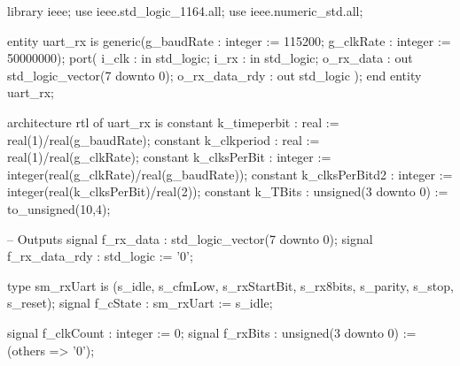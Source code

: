 \begin{VHDLlisting}[tabsize=8]
library ieee;
use ieee.std_logic_1164.all;
use ieee.numeric_std.all;

entity uart_rx is
  generic(g_baudRate : integer := 115200;
          g_clkRate  : integer := 50000000);
  port(
      i_clk           : in    std_logic;
      i_rx            : in    std_logic;
      o_rx_data       : out   std_logic_vector(7 downto 0);
      o_rx_data_rdy   : out   std_logic
  );
end entity uart_rx;

architecture rtl of uart_rx is
  constant k_timeperbit   : real := real(1)/real(g_baudRate);
  constant k_clkperiod    : real := real(1)/real(g_clkRate);
  constant k_clksPerBit   : integer := 
                            integer(real(g_clkRate)/real(g_baudRate));
  constant k_clksPerBitd2 : integer := 
                            integer(real(k_clksPerBit)/real(2));
  constant k_TBits        : unsigned(3 downto 0) := to_unsigned(10,4);

  -- Outputs 
  signal f_rx_data     : std_logic_vector(7 downto 0);
  signal f_rx_data_rdy : std_logic := '0';
  
  type sm_rxUart is (s_idle, 
                     s_cfmLow, 
                     s_rxStartBit, 
                     s_rx8bits, 
                     s_parity, 
                     s_stop, 
                     s_reset);
  signal f_cState : sm_rxUart := s_idle;
  
  signal f_clkCount : integer := 0;
  signal f_rxBits   : unsigned(3 downto 0) := (others => '0');
  

\end{VHDLlisting}

